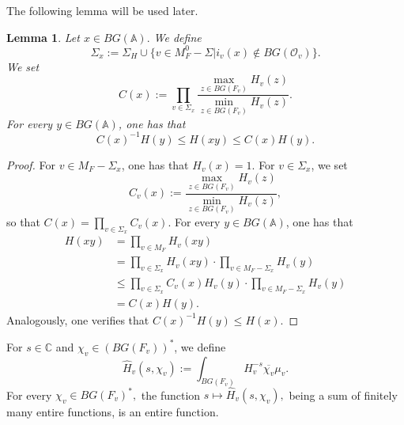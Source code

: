 \documentclass[a4paper,english,12pt]{amsart}
\newcommand{\GG}{ G}
\newcommand{\CC}{\mathbb{C}}
\newcommand{\Ov}{\mathcal O _v}
\newcommand{\AAA}{\mathbb A}
\newcommand{\wH}{\widehat H}
\newtheorem{lem}[equation]{Lemma}
\numberwithin{equation}{subsection}
\begin{document}
\subsubsection{} The following lemma will be used later.
\begin{lem}\label{codx}
Let $x\in BG(\AAA).$ We define $$\Sigma_x:=\Sigma_H\cup\{v\in M^0_F-\Sigma|i_v(x)\not\in B\GG(\Ov)\}.$$  We set $$C(x):=\prod_{v\in\Sigma_x}\frac{\max_{z\in BG(F_v)}H_v(z)}{\min_{z\in BG(F_v)}H_v(z)}.$$ For every $y\in BG(\AAA)$, one has that $$C(x)^{-1}H(y)\leq H(xy)\leq C(x)H(y).$$
\end{lem}
\begin{proof}
For $v\in M_F-\Sigma_x$, one has that $H_v(x)=1.$ For $v\in\Sigma_x$, we set $$C_v(x):=\frac{\max_{z\in BG(F_v)}H_v(z)}{\min_{z\in BG(F_v)}H_v(z)},$$ so that $C(x)=\prod_{v\in\Sigma_x}C_v(x).$ For every $y\in BG(\AAA)$, one has that \begin{align*}
H(xy)&=\prod_{v\in M_F}H_v(xy)\\
&=\prod_{v\in\Sigma_x}H_v(xy)\cdot\prod_{v\in M_F-\Sigma_x}H_v(y)\\
&\leq \prod_{v\in\Sigma_x}C_v(x)H_v(y)\cdot\prod_{v\in M_F-\Sigma_x}H_v(y)\\
&=C(x)H(y).
\end{align*}
Analogously, one verifies that $C(x)^{-1}H(y)\leq H(x)$.
\end{proof}
For $s\in\CC$ and $\chi_v\in (BG(F_v))^*$,  we define $$\wH_v(s,\chi_v):=\int_{BG(F_v)}H_v^{-s}\overline{\chi_v}\mu_v.$$ 
For every $\chi_v\in BG(F_v)^*,$ the function $s\mapsto\wH_v(s,\chi_v),$ being a sum of finitely many entire functions, is an entire function.
\end{document}
